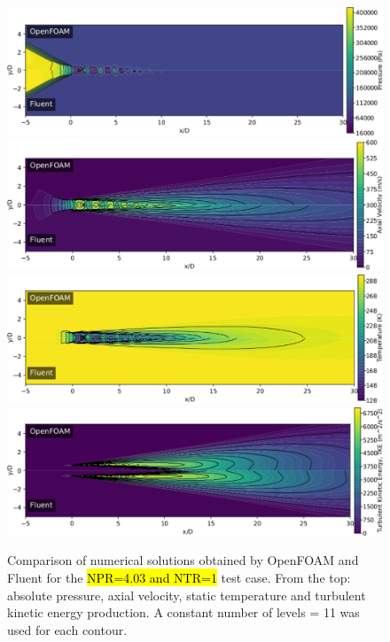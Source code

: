 \documentclass[12pt]{article}
\begin{document}
\begin{figure}[H]
    \centering
    \includegraphics[width=\linewidth]{figs/P_viridis.pdf}
    \includegraphics[width=\linewidth]{figs/U_viridis.pdf}\\
    \includegraphics[width=\linewidth]{figs/T_viridis.pdf}\\
    \includegraphics[width=\linewidth]{figs/TKE_viridis.pdf}\\
    \caption{Comparison of numerical solutions obtained by OpenFOAM and Fluent for the \hl{NPR=4.03 and NTR=1} test case. From the top: absolute pressure, axial velocity, static temperature and turbulent kinetic energy production. A constant number of levels = 11 was used for each contour.}
    \label{fig:cfd-comp}
\end{figure}
\end{document}
